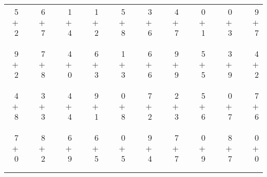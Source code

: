 \documentclass[12pt, letterpaper]{article}
\begin{document}
\begin{tabular}{rrrrrrrrrrrrrrrrrrr}
5 & & 6 & & 1 & & 1 & & 5 & & 3 & & 4 & & 0 & & 0 & & 9\\
$+$ 2 & & $+$ 7 & & $+$ 4 & & $+$ 2 & & $+$ 8 & & $+$ 6 & & $+$ 7 & & $+$ 1 & & $+$ 3 & & $+$ 7\\
\cline{1-1} \cline{3-3} \cline{5-5} \cline{7-7} \cline{9-9} \cline{11-11} \cline{13-13} \cline{15-15} \cline{17-17} \cline{19-19} \\ \\
9 & & 7 & & 4 & & 6 & & 1 & & 6 & & 9 & & 5 & & 3 & & 4\\
$+$ 2 & & $+$ 8 & & $+$ 0 & & $+$ 3 & & $+$ 3 & & $+$ 6 & & $+$ 9 & & $+$ 5 & & $+$ 9 & & $+$ 2\\
\cline{1-1} \cline{3-3} \cline{5-5} \cline{7-7} \cline{9-9} \cline{11-11} \cline{13-13} \cline{15-15} \cline{17-17} \cline{19-19} \\ \\
4 & & 3 & & 4 & & 9 & & 0 & & 7 & & 2 & & 5 & & 0 & & 7\\
$+$ 8 & & $+$ 3 & & $+$ 4 & & $+$ 1 & & $+$ 8 & & $+$ 2 & & $+$ 3 & & $+$ 6 & & $+$ 7 & & $+$ 6\\
\cline{1-1} \cline{3-3} \cline{5-5} \cline{7-7} \cline{9-9} \cline{11-11} \cline{13-13} \cline{15-15} \cline{17-17} \cline{19-19} \\ \\
7 & & 8 & & 6 & & 6 & & 0 & & 9 & & 7 & & 0 & & 8 & & 0\\
$+$ 0 & & $+$ 2 & & $+$ 9 & & $+$ 5 & & $+$ 5 & & $+$ 4 & & $+$ 7 & & $+$ 9 & & $+$ 7 & & $+$ 0\\
\cline{1-1} \cline{3-3} \cline{5-5} \cline{7-7} \cline{9-9} \cline{11-11} \cline{13-13} \cline{15-15} \cline{17-17} \cline{19-19} \\ \\
\end{tabular}
\newpage
\end{document}
